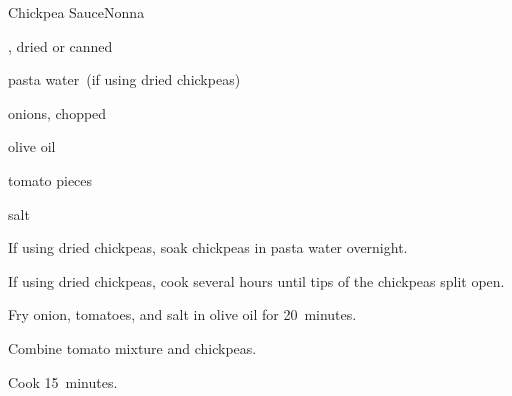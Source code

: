 \begin{recipe}{Chickpea Sauce}{Nonna}{}

\begin{ingredients}
\item {}, dried or canned
\item pasta water~(if using dried chickpeas)
\item onions, chopped
\item olive oil
\item tomato pieces
\item salt
\end{ingredients}

\begin{directions}
\item If using dried chickpeas, soak chickpeas in pasta water overnight.
\item If using dried chickpeas, cook several hours until tips of the chickpeas split open.
\item Fry onion, tomatoes, and salt in olive oil for 20~minutes.
\item Combine tomato mixture and chickpeas.
\item Cook 15~minutes.
\end{directions}

\end{recipe}
